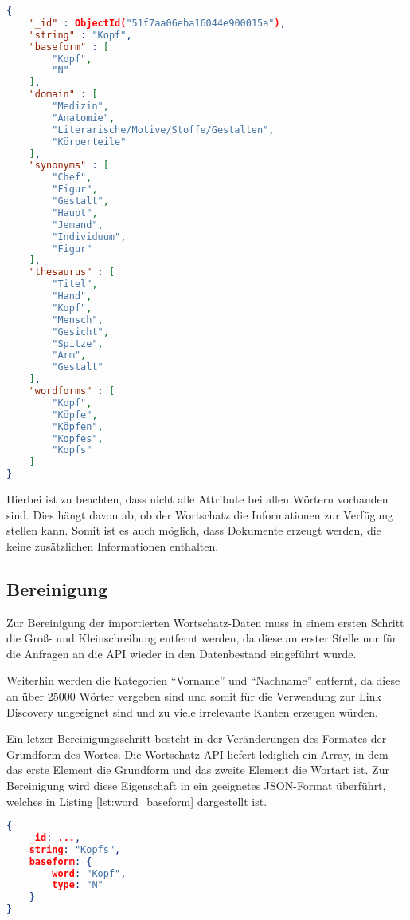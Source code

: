 \begin{lstlisting}[language=json, label={lst:wortschatz_import}, caption={Wortschatz-Dokument nach dem Import}]
{
    "_id" : ObjectId("51f7aa06eba16044e900015a"),
    "string" : "Kopf",
    "baseform" : [ 
        "Kopf", 
        "N"
    ],
    "domain" : [ 
        "Medizin", 
        "Anatomie", 
        "Literarische/Motive/Stoffe/Gestalten", 
        "Körperteile"
    ],
    "synonyms" : [  
        "Chef", 
        "Figur", 
        "Gestalt", 
        "Haupt", 
        "Jemand", 
        "Individuum", 
        "Figur"
    ],
    "thesaurus" : [ 
        "Titel", 
        "Hand", 
        "Kopf", 
        "Mensch", 
        "Gesicht", 
        "Spitze", 
        "Arm", 
        "Gestalt"
    ],
    "wordforms" : [ 
        "Kopf", 
        "Köpfe", 
        "Köpfen", 
        "Kopfes", 
        "Kopfs"
    ]
}
\end{lstlisting}

Hierbei ist zu beachten, dass nicht alle Attribute bei allen Wörtern vorhanden sind. Dies hängt davon ab, ob der Wortschatz die Informationen zur Verfügung stellen kann. Somit ist es auch möglich, dass Dokumente erzeugt werden, die keine zusätzlichen Informationen enthalten.

\subsection{Bereinigung}

Zur Bereinigung der importierten Wortschatz-Daten muss in einem ersten Schritt die Groß- und Kleinschreibung entfernt werden, da diese an erster Stelle nur für die Anfragen an die API wieder in den Datenbestand eingeführt wurde.

Weiterhin werden die Kategorien ``Vorname'' und ``Nachname'' entfernt, da diese an über \num{25000} Wörter vergeben sind und somit für die Verwendung zur Link Discovery ungeeignet sind und zu viele irrelevante Kanten erzeugen würden.

Ein letzer Bereinigungsschritt besteht in der Veränderungen des Formates der Grundform des Wortes. Die Wortschatz-API liefert lediglich ein Array, in dem das erste Element die Grundform und das zweite Element die Wortart ist. Zur Bereinigung wird diese Eigenschaft in ein geeignetes JSON-Format überführt, welches in Listing \ref{lst:word_baseform} dargestellt ist.

\begin{lstlisting}[language=json, label={lst:word_baseform}, caption={Grundform eines Wortes}]
{
    _id: ...,
    string: "Kopfs",
    baseform: {
        word: "Kopf",
        type: "N"
    }
}
\end{lstlisting}

